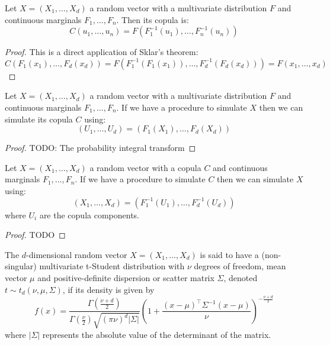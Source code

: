 \documentclass[11pt,fleqn]{book} %
\begin{document}
\begin{corollary}
Let $X=(X_1, \dots, X_d)$ a random vector with a multivariate 
distribution $F$ and continuous marginals $F_1, \dots, F_n$. 
Then its copula is:
\begin{displaymath}
C(u_1,\dots,u_n) = F(F_1^{-1}(u_1), \dots, F_n^{-1}(u_n))
\end{displaymath}
\end{corollary}
\begin{proof}
This is a direct application of Sklar's theorem:
\begin{displaymath}
C(F_1(x_1), \dots, F_d(x_d)) = 
F(F_1^{-1}(F_1(x_1)), \dots, F_d^{-1}(F_d(x_d))) = 
F(x_1, \dots, x_d)
\end{displaymath}
\end{proof}


\begin{corollary}
Let $X=(X_1, \dots, X_d)$ a random vector with a multivariate 
distribution $F$ and continuous marginals $F_1, \dots, F_n$.
If we have a procedure to simulate $X$ then we can simulate 
its copula $C$ using:
\begin{displaymath}
(U_1, \dots, U_d) = (F_1(X_1), \dots, F_d(X_d))
\end{displaymath}
\end{corollary}
\begin{proof}
TODO: The probability integral transform
\end{proof}


\begin{corollary}
Let $X=(X_1, \dots, X_d)$ a random vector with a copula $C$
and continuous marginals $F_1, \dots, F_n$. If we have a
procedure to simulate $C$ then we can simulate $X$ using:
\begin{displaymath}
(X_1, \dots, X_d) = (F_1^{-1}(U_1), \dots, F_d^{-1}(U_d))
\end{displaymath}
where $U_i$ are the copula components.
\end{corollary}
\begin{proof}
TODO
\end{proof}


\begin{definition}
The $d$-dimensional random vector $X=(X_1,\dots,X_d)$ is said to have a 
(non-singular) multivariate t-Student distribution with $\nu$ degrees of freedom, 
mean vector $\mu$ and positive-definite dispersion or scatter matrix $\Sigma$, 
denoted $t \sim t_d(\nu,\mu,\Sigma)$, if its density is given by
\begin{displaymath}
f(x)=\frac{\Gamma\left(\frac{\nu+d}{2}\right)}{\Gamma\left(\frac{\nu}{2}\right)\sqrt{(\pi \nu)^d |\Sigma|}}
\left(
1+ \frac{(x-\mu)^\top\Sigma^{-1}(x-\mu)}{\nu}
\right)^{-\frac{\nu+d}{2}}
\end{displaymath}
\noindent where $|\Sigma|$ represents the absolute value of the determinant of the matrix. 
\end{definition}
\end{document}
